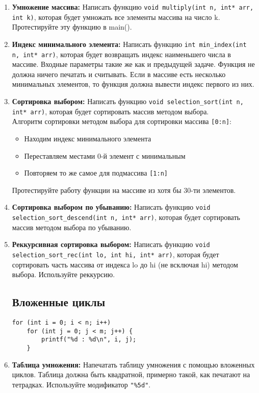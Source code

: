 \documentclass{article}
\begin{document}
\begin{enumerate}
\item \textbf{Умножение массива:} Написать функцию \texttt{void multiply(int n, int* arr, int k)}, которая будет умножать все элементы массива на число k. Протестируйте эту функцию в main().

\item \textbf{Индекс минимального элемента:} Написать функцию \texttt{int min\_index(int n, int* arr)}, которая будет возвращать индекс наименьшего числа в массиве. Входные параметры такие же как и предыдущей задаче. Функция не должна ничего печатать и считывать. Если в массиве есть несколько минимальных элементов, то функция должна вывести индекс первого из них.

\item \textbf{Сортировка выбором:} Написать функцию \texttt{void selection\_sort(int n, int* arr)}, которая будет сортировать массив методом выбора. \\
Алгоритм сортировки методом выбора для сортировки массива \texttt{[0:n]}:
\begin{itemize}
\item Находим индекс минимального элемента
\item Переставляем местами 0-й элемент с минимальным
\item Повторяем то же самое для подмассива \texttt{[1:n]} 
\end{itemize}
Протестируйте работу функции на массиве из хотя бы 30-ти элементов.

\item \textbf{Сортировка выбором по убыванию:} Написать функцию \texttt{void selection\_sort\_descend(int n, int* arr)}, которая будет сортировать массив методом выбора по убыванию.

\item \textbf{Реккурсивная сортировка выбором:} Написать функцию \texttt{void selection\_sort\_rec(int lo, int hi, int* arr)}, которая будет сортировать часть массива от индекса lo до hi (не всключая hi) методом выбора. Используйте реккурсию. \\


\subsection*{Вложенные циклы}
\begin{lstlisting}
for (int i = 0; i < n; i++)
	for (int j = 0; j < m; j++) {
		printf("%d : %d\n", i, j);
	}
\end{lstlisting}
\item \textbf{Таблица умножения:} Напечатать таблицу умножения с помощью вложенных циклов. Таблица должна быть квадратной, примерно такой, как печатают на тетрадках. Используйте модификатор \texttt{"\%5d"}.


\end{enumerate}
\end{document}
